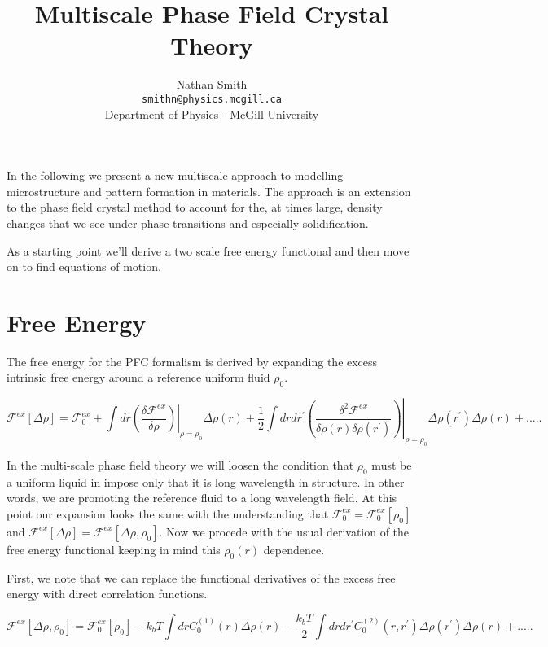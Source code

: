 \documentclass[11pt]{article}
\title{Multiscale Phase Field Crystal Theory}
\author{Nathan Smith\\
\texttt{smithn@physics.mcgill.ca}\\
Department of Physics - McGill University}
\begin{document}
\maketitle
\doublespacing

In the following we present a new multiscale approach to modelling microstructure and pattern formation in materials. The approach is an extension to the phase field crystal method to account for the, at times large, density changes that we see under phase transitions and especially solidification. 

As a starting point we'll derive a two scale free energy functional and then move on to find equations of motion.

\section{Free Energy}

The free energy for the PFC formalism is derived by expanding the excess intrinsic free energy around a reference uniform fluid $\rho_0$.

\begin{equation}
\mathcal{F}^{ex}[\Delta \rho] = \mathcal{F}^{ex}_0 
+ \int dr \left.\left(\frac{\delta \mathcal{F}^{ex}}{\delta \rho} \right)\right\rvert_{\rho=\rho_0}\Delta \rho(r) 
+ \frac{1}{2}\int dr dr^\prime  \left.\left(\frac{\delta^2 \mathcal{F}^{ex}}{\delta\rho(r)\delta\rho(r^\prime)}\right)\right\rvert_{\rho = \rho_0} \Delta \rho(r^\prime) \Delta \rho(r) + .....
\end{equation}

In the multi-scale phase field theory we will loosen the condition that $\rho_0$ must be a uniform liquid in impose only that it is long wavelength in structure. In other words, we are promoting the reference fluid to a long wavelength field. At this point our expansion looks the same with the understanding that $\mathcal{F}^{ex}_0 = \mathcal{F}^{ex}_0[\rho_0]$ and $\mathcal{F}^{ex}[\Delta \rho] = \mathcal{F}^{ex}[\Delta \rho, \rho_0]$. Now we procede with the usual derivation of the free energy functional keeping in mind this $\rho_0(r)$ dependence.

First, we note that we can replace the functional derivatives of the excess free energy with direct correlation functions. 

\begin{equation}
\mathcal{F}^{ex}[\Delta \rho, \rho_0] = \mathcal{F}^{ex}_0[\rho_0] 
- k_bT \int dr C^{(1)}_0(r)\Delta \rho(r) 
- \frac{k_bT}{2}\int dr dr^\prime C^{(2)}_0(r, r^\prime) \Delta \rho(r^\prime) \Delta \rho(r) + .....
\end{equation}
\end{document}
